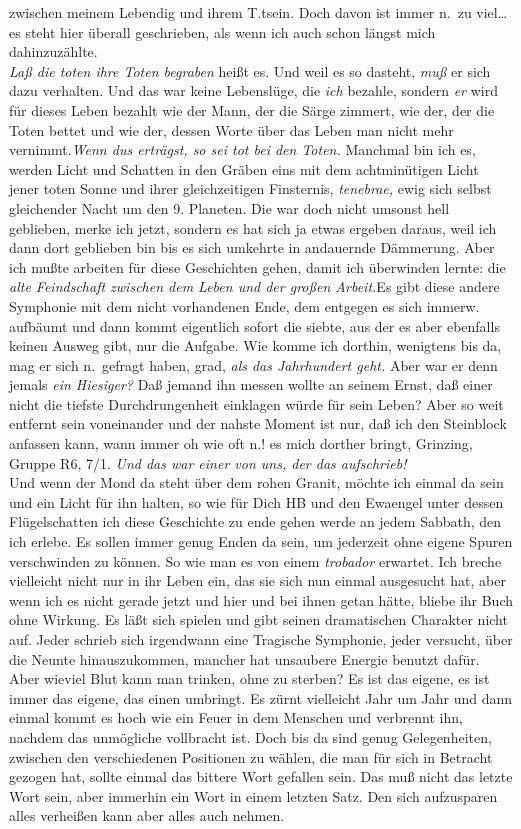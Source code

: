 \documentclass[
]{article}
\begin{document}
zwischen meinem Lebendig und ihrem T.tsein. Doch davon ist immer n.~zu
viel\ldots{} es steht hier überall geschrieben, als wenn ich auch schon
längst mich dahinzuzählte.\\
\emph{Laß die toten ihre Toten begraben }heißt es. Und weil es so
dasteht, \emph{muß} er sich dazu verhalten. Und das war keine
Lebenslüge, die \emph{ich} bezahle, sondern \emph{er} wird für dieses
Leben bezahlt wie der Mann, der die Särge zimmert, wie der, der die
Toten bettet und wie der, dessen Worte über das Leben man nicht mehr
vernimmt.\emph{Wenn du\textquotesingle s erträgst, so sei tot bei den
Toten.} Manchmal bin ich es, werden Licht und Schatten in den Gräben
eins mit dem achtminütigen Licht jener toten Sonne und ihrer
gleichzeitigen Finsternis, \emph{tenebrae, }ewig sich selbst gleichender
Nacht um den 9. Planeten. Die war doch nicht umsonst hell geblieben,
merke ich jetzt, sondern es hat sich ja etwas ergeben daraus, weil ich
dann dort geblieben bin bis es sich umkehrte in andauernde Dämmerung.
Aber ich mußte arbeiten für diese Geschichten gehen, damit ich
überwinden lernte: die \emph{alte Feindschaft zwischen dem Leben und der
großen Arbeit.}Es gibt diese andere Symphonie mit dem nicht vorhandenen
Ende, dem entgegen es sich immerw. aufbäumt und dann kommt eigentlich
sofort die siebte, aus der es aber ebenfalls keinen Ausweg gibt, nur die
Aufgabe. Wie komme ich dorthin, wenigtens bis da, mag er sich n.~gefragt
haben, grad, \emph{als das Jahrhundert geht.} Aber war er denn jemals
\emph{ein Hiesiger? }Daß jemand ihn messen wollte an seinem Ernst, daß
einer nicht die tiefste Durchdrungenheit einklagen würde für sein Leben?
Aber so weit entfernt sein voneinander und der nahste Moment ist nur,
daß ich den Steinblock anfassen kann, wann immer oh wie oft n.! es mich
dorther bringt, Grinzing, Gruppe R6, 7/1. \emph{Und das war einer von
uns, der das aufschrieb!}\\
Und wenn der Mond da steht über dem rohen Granit, möchte ich einmal da
sein und ein Licht für ihn halten, so wie für Dich HB und den Ewaengel
unter dessen Flügelschatten ich diese Geschichte zu ende gehen werde an
jedem Sabbath, den ich erlebe. Es sollen immer genug Enden da sein, um
jederzeit ohne eigene Spuren verschwinden zu können. So wie man es von
einem \emph{trobador} erwartet. Ich breche vielleicht nicht nur in ihr
Leben ein, das sie sich nun einmal ausgesucht hat, aber wenn ich es
nicht gerade jetzt und hier und bei ihnen getan hätte, bliebe ihr Buch
ohne Wirkung. Es läßt sich spielen und gibt seinen dramatischen
Charakter nicht auf. Jeder schrieb sich irgendwann eine Tragische
Symphonie, jeder versucht, über die Neunte hinauszukommen, mancher hat
unsaubere Energie benutzt dafür. Aber wieviel Blut kann man trinken,
ohne zu sterben? Es ist das eigene, es ist immer das eigene, das einen
umbringt. Es zürnt vielleicht Jahr um Jahr und dann einmal kommt es hoch
wie ein Feuer in dem Menschen und verbrennt ihn, nachdem das unmögliche
vollbracht ist. Doch bis da sind genug Gelegenheiten, zwischen den
verschiedenen Positionen zu wählen, die man für sich in Betracht gezogen
hat, sollte einmal das bittere Wort gefallen sein. Das muß nicht das
letzte Wort sein, aber immerhin ein Wort in einem letzten Satz. Den sich
aufzusparen alles verheißen kann aber alles auch nehmen.
\end{document}
